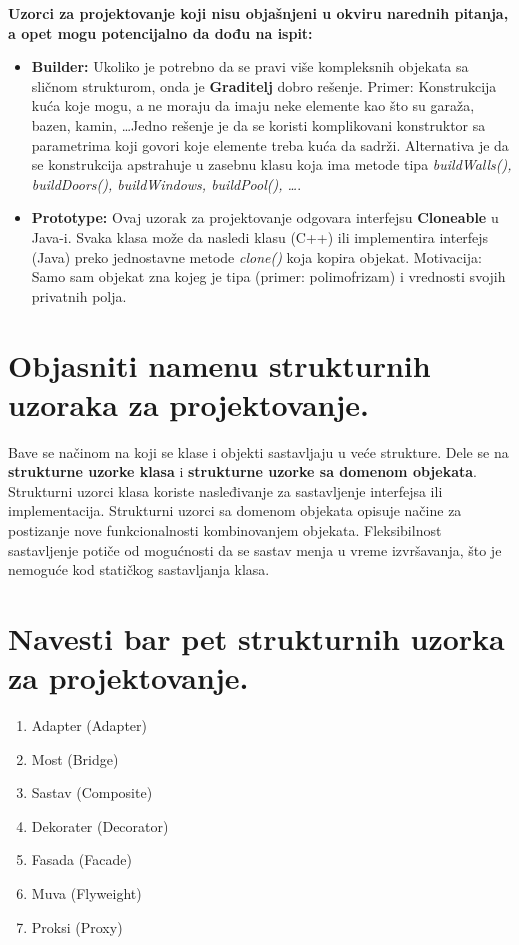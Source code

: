 \documentclass[a4paper]{article}
\begin{document}
  \textbf{Uzorci za projektovanje koji nisu objašnjeni u okviru narednih pitanja, a opet mogu potencijalno da
          dođu na ispit:}
  \begin{itemize}
    \item \textbf{Builder:} Ukoliko je potrebno da se pravi više kompleksnih objekata sa sličnom strukturom, onda je
          \textbf{Graditelj} dobro rešenje. Primer: Konstrukcija kuća koje mogu, a ne moraju da imaju neke elemente
          kao što su garaža, bazen, kamin, \dots Jedno rešenje je da se koristi komplikovani konstruktor sa parametrima
          koji govori koje elemente treba kuća da sadrži. Alternativa je da se konstrukcija apstrahuje u zasebnu klasu
          koja ima metode tipa \textit{buildWalls(), buildDoors(), buildWindows, buildPool(), \dots}.
    \item \textbf{Prototype:} Ovaj uzorak za projektovanje odgovara interfejsu \textbf{Cloneable} u Java-i. Svaka
          klasa može da nasledi klasu (C++) ili implementira interfejs (Java) preko jednostavne metode \textit{clone()}
          koja kopira objekat. Motivacija: Samo sam objekat zna kojeg je tipa (primer: polimofrizam) i vrednosti
          svojih privatnih polja.
  \end{itemize}

\section{Objasniti namenu strukturnih uzoraka za projektovanje.}
  Bave se načinom na koji se klase i objekti sastavljaju u veće strukture. Dele se na 
  \textbf{strukturne uzorke klasa} i \textbf{strukturne uzorke sa domenom objekata}.
  Strukturni uzorci klasa koriste nasleđivanje za sastavljenje interfejsa ili
  implementacija. Strukturni uzorci sa domenom objekata opisuje načine za postizanje nove
  funkcionalnosti kombinovanjem objekata. Fleksibilnost sastavljenje potiče od mogućnosti 
  da se sastav menja u vreme izvršavanja, što je nemoguće kod statičkog sastavljanja klasa.

\section{Navesti bar pet strukturnih uzorka za projektovanje.}
  \begin{enumerate}
    \item Adapter (Adapter)
    \item Most (Bridge)
    \item Sastav (Composite)
    \item Dekorater (Decorator)
    \item Fasada (Facade)
    \item Muva (Flyweight)
    \item Proksi (Proxy)
  \end{enumerate}
\end{document}
